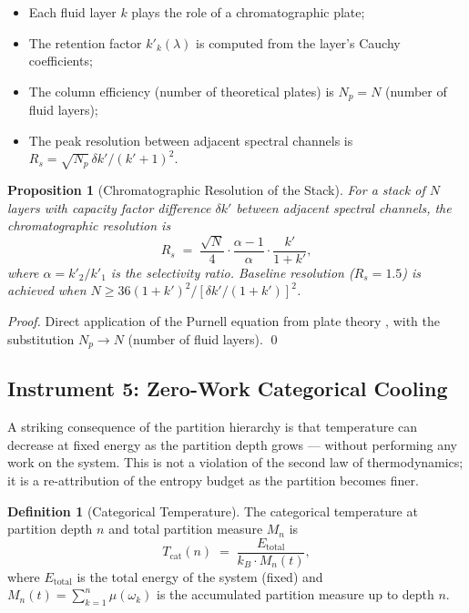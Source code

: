 \documentclass[11pt,twocolumn,a4paper]{article}
\theoremstyle{plain}
\newtheorem{proposition}[theorem]{Proposition}
\theoremstyle{definition}
\newtheorem{definition}[theorem]{Definition}
\theoremstyle{remark}
\begin{document}
\begin{itemize}[noitemsep]
  \item Each fluid layer $k$ plays the role of a chromatographic plate;
  \item The retention factor $k'_k(\lambda)$ is computed from the layer's Cauchy coefficients;
  \item The column efficiency (number of theoretical plates) is $N_p = N$ (number of fluid layers);
  \item The peak resolution between adjacent spectral channels is $R_s = \sqrt{N_p}\,\delta k'/(k'+1)^2$.
\end{itemize}

\begin{proposition}[Chromatographic Resolution of the Stack]
\label{prop:chrom-resolution}
For a stack of $N$ layers with capacity factor difference $\delta k'$ between adjacent spectral channels, the chromatographic resolution is
\begin{equation}
\label{eq:chrom-resolution}
  R_s \;=\; \frac{\sqrt{N}}{4}\cdot\frac{\alpha-1}{\alpha}\cdot\frac{k'}{1+k'},
\end{equation}
where $\alpha=k'_2/k'_1$ is the selectivity ratio. Baseline resolution ($R_s=1.5$) is achieved when $N\geq 36(1+k')^2/[\delta k'/(1+k')]^2$.
\end{proposition}

\begin{proof}
Direct application of the Purnell equation from plate theory \cite{Skoog2007}, with the substitution $N_p\to N$ (number of fluid layers). \qed
\end{proof}

\subsection{Instrument 5: Zero-Work Categorical Cooling}
\label{sec:zero-work-cooling}

A striking consequence of the partition hierarchy is that temperature can decrease at fixed energy as the partition depth grows — without performing any work on the system. This is not a violation of the second law of thermodynamics; it is a re-attribution of the entropy budget as the partition becomes finer.

\begin{definition}[Categorical Temperature]
\label{def:categorical-temperature}
The categorical temperature at partition depth $n$ and total partition measure $M_n$ is
\begin{equation}
\label{eq:categorical-temperature}
  T_\text{cat}(n) \;=\; \frac{E_\text{total}}{k_B\cdot M_n(t)},
\end{equation}
where $E_\text{total}$ is the total energy of the system (fixed) and $M_n(t)=\sum_{k=1}^n \mu(\omega_k)$ is the accumulated partition measure up to depth $n$.
\end{definition}
\end{document}
